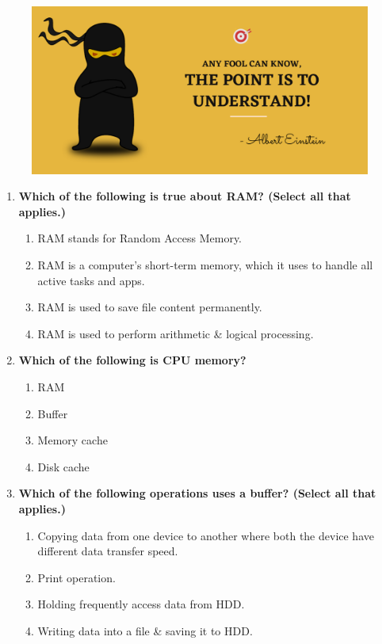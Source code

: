 \setlength{\columnsep}{3pt}
\begin{flushleft}
	
	\paragraph{}
	\bigskip
	
	\begin{figure}[h!]
		\centering
		\includegraphics[scale=.2]{content/practise.jpg}
	\end{figure}	
	\begin{enumerate}
		
		\item \textbf{Which of the following is true about RAM? (Select all that applies.)}
		\begin{enumerate}[label=(\alph*)]
			\item RAM stands for Random Access Memory.  %
			\item RAM is a computer's short-term memory, which it uses to handle all active tasks and apps. %
			\item RAM is used to save file content permanently.
			\item RAM is used to perform arithmetic \& logical processing.
		\end{enumerate}
		\bigskip
		\bigskip
		
		\item \textbf{Which of the following is CPU memory?}
		\begin{enumerate}[label=(\alph*)]
			\item RAM  
			\item Buffer 
			\item Memory cache %
			\item Disk cache
		\end{enumerate}
		\bigskip
		\bigskip	
		
		\item \textbf{Which of the following operations uses a buffer? (Select all that applies.)}
		\begin{enumerate}[label=(\alph*)]
			\item Copying data from one device to another where both the device have different data transfer speed. %
			\item Print operation. %
			\item Holding frequently access data from HDD.
			\item Writing data into a file \& saving it to HDD. %
		\end{enumerate}
		\bigskip
		\bigskip	



\end{enumerate}
\end{flushleft}
